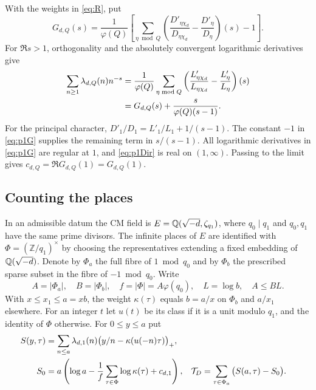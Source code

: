 With the weights in \eqref{eq:R}, put
\begin{equation}\label{eq:p1G}
 G_{d,Q}(s)=\frac1{\varphi(Q)}\left[
  \sum_{\eta\bmod Q}\left(\frac{D'_{\eta\chi_d}}{D_{\eta\chi_d}}
                             -\frac{D'_\eta}{D_\eta}\right)(s)-1\right].
\end{equation}
For $\Re s>1$, orthogonality and the absolutely convergent logarithmic derivatives give
\begin{align}
 \sum_{n\ge1}\lambda_{d,Q}(n)n^{-s}
 &=\frac1{\varphi(Q)}\sum_{\eta\bmod Q}
       \left(\frac{L'_{\eta\chi_d}}{L_{\eta\chi_d}}-
             \frac{L'_\eta}{L_\eta}\right)(s)\notag\\
 &=G_{d,Q}(s)+\frac{s}{\varphi(Q)(s-1)}.\label{eq:p1Dir}
\end{align}
For the principal character, $D'_1/D_1=L'_1/L_1+1/(s-1)$. The constant $-1$ in \eqref{eq:p1G} supplies the remaining term in $s/(s-1)$. All logarithmic derivatives in \eqref{eq:p1G} are regular at $1$, and \eqref{eq:p1Dir} is real on $(1,\infty)$. Passing to the limit gives $c_{d,Q}=\Re G_{d,Q}(1)=G_{d,Q}(1)$.


\subsection{Counting the places}
In an admissible datum the CM field is $E=\mathbb Q(\sqrt{-d},\zeta_{q_1})$, where $q_0\mid q_1$ and $q_0,q_1$ have the same prime divisors. The infinite places of $E$ are identified with $\Phi=(\mathbb Z/q_1)^\times$ by choosing the representatives extending a fixed embedding of $\mathbb Q(\sqrt{-d})$. Denote by $\Phi_a$ the full fibre of $1\bmod q_0$ and by $\Phi_b$ the prescribed sparse subset in the fibre of $-1\bmod q_0$. Write
\[
 A=|\Phi_a|,\quad B=|\Phi_b|,\quad f=|\Phi|=A\varphi(q_0),\quad
 L=\log b,\quad A\le BL.
\]
With $x\le x_1\le a=xb$, the weight $\kappa(\tau)$ equals $b=a/x$ on $\Phi_b$ and $a/x_1$ elsewhere. For an integer $t$ let $u(t)$ be its class if it is a unit modulo $q_1$, and the identity of $\Phi$ otherwise. For $0\le y\le a$ put
\begin{align}
 S(y,\tau)&=\sum_{n\le a}\lambda_{d,1}(n)
       \big(y/n-\kappa(u(-n)\tau)\big)_+,\notag\\
 S_0&=a\left(\log a-\frac1f\sum_{\tau\in\Phi}\log\kappa(\tau)+c_{d,1}\right),
 &\mathcal T_D&=\sum_{\tau\in\Phi_a}\big(S(a,\tau)-S_0\big).\label{eq:total}
\end{align}

